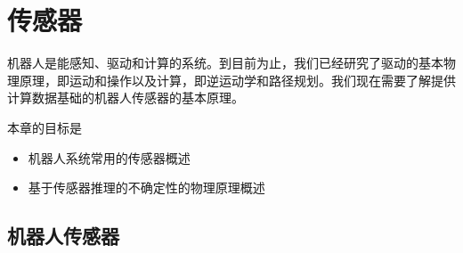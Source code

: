 \chapter{传感器}
\label{chap:sensors}

机器人是能感知、驱动和计算的系统。到目前为止，我们已经研究了驱动的基本物理原理，即运动和操作以及计算，即逆运动学和路径规划。我们现在需要了解提供计算数据基础的机器人传感器的基本原理。


本章的目标是

\begin{itemize}

\item 机器人系统常用的传感器概述
\item 基于传感器推理的不确定性的物理原理概述
\end{itemize}


\section{机器人传感器}


